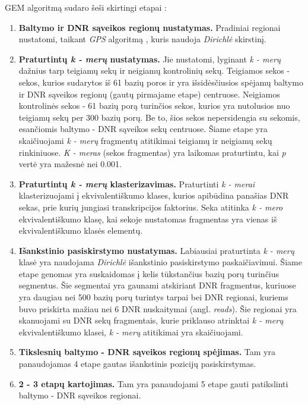 \documentclass[12pt]{article}
\begin{document}
GEM algoritmą sudaro šeši skirtingi etapai \cite{ARTICLE15}:
\begin{enumerate}
    \item \textbf{Baltymo ir DNR sąveikos regionų nustatymas.} Pradiniai
        regionai nustatomi, taikant \emph{GPS} algoritmą \cite{ARTICLE14},
        kuris naudoja \emph{Dirichlė} skirstinį.
    \item \textbf{Praturtintų \emph{k - merų} nustatymas.} Jie nustatomi,
        lyginant \emph{k - merų} dažnius tarp teigiamų sekų ir neigiamų
        kontrolinių sekų. Teigiamos sekos - sekos, kurios sudarytos iš 61
        bazių poros ir yra išsidėsčiusios spėjamų baltymo ir DNR sąveikos
        regionų (gautų pirmajame etape) centruose. Neigiamos kontrolinės
        sekos - 61 bazių porą turinčios sekos, kurios yra nutolusios nuo
        teigiamų sekų per 300 bazių porų. Be to, šios sekos nepersidengia su
        sekomis, esančiomis baltymo - DNR sąveikos sekų centruose. Šiame
        etape yra skaičiuojami \emph{k - merų} fragmentų atitikimai teigiamų
        ir neigiamų sekų rinkiniuose. \emph{K - meras} (sekos fragmentas)
        yra laikomas praturtintu, kai \emph{p} vertė yra mažesnė nei 0.001.
    \item \textbf{Praturtintų \emph{k - merų} klasterizavimas.} Praturtinti
        \emph{k - merai} klasterizuojami į ekvivalentiškumo klases, kurios
        apibūdina panašias DNR sekas, prie kurių jungiasi transkripcijos
        faktorius. Seka atitinka \emph{k - mero} ekvivalentiškumo klasę, kai
        sekoje nustatomas fragmentas yra vienas iš ekvivalentiškumo klasės
        elementų.
    \item \textbf{Išankstinio pasiskirstymo nustatymas.} Labiausiai praturtinta
        \emph{k - merų} klasė yra naudojama \emph{Dirichlė} išankstinio
        pasiskirstymo paskaičiavimui. Šiame etape genomas yra suskaidomas į
        kelis tūkstančius bazių porų turinčius segmentus. Šie segmentai yra
        gaunami atskiriant DNR fragmentus, kuriuose yra daugiau nei 500 bazių
        porų turintys tarpai bei DNR regionai, kuriems buvo priskirta mažiau
        nei 6 DNR nuskaitymai (angl. \emph{reads}). Šie regionai yra
        skanuojami su DNR sekų fragmentais, kurie priklauso atrinktai
        \emph{k - merų} ekvivalentiškumo klasei, \emph{k - merų}
        atitikimai yra skaičiuojami.
    \item \textbf{Tikslesnių baltymo - DNR sąveikos regionų spėjimas.} Tam yra
        panaudojamas 4 etape gautas išankstinis pozicijų pasiskirstymas.
    \item \textbf{2 - 3 etapų kartojimas.} Tam yra panaudojami 5 etape gauti
        patikslinti baltymo - DNR sąveikos regionai.
\end{enumerate}
\end{document}
